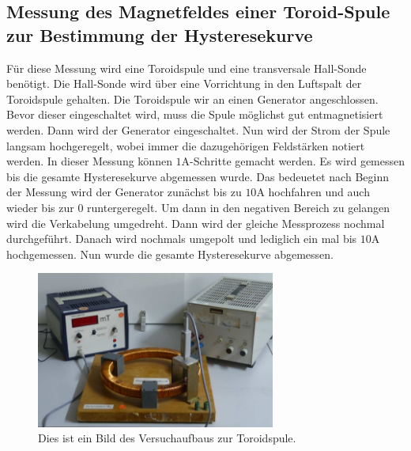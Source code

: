 \subsection{Messung des Magnetfeldes einer Toroid-Spule zur Bestimmung der Hysteresekurve}
\label{subsec:D_Hysterese}
Für diese Messung wird eine Toroidspule und eine transversale Hall-Sonde benötigt. Die Hall-Sonde wird über eine Vorrichtung in den Luftspalt der Toroidspule gehalten. Die Toroidspule
wir an einen Generator angeschlossen. Bevor dieser eingeschaltet wird, muss die Spule möglichst gut entmagnetisiert werden. Dann wird der Generator eingeschaltet. Nun wird der Strom
der Spule langsam hochgeregelt, wobei immer die dazugehörigen Feldstärken notiert werden. In dieser Messung können $1\unit{\ampere}$-Schritte gemacht werden. Es wird gemessen bis die 
gesamte Hysteresekurve abgemessen wurde. Das bedeuetet nach Beginn der Messung wird der Generator zunächst bis zu $10\unit{\ampere}$ hochfahren und auch wieder bis zur $0$ runtergeregelt.
Um dann in den negativen Bereich zu gelangen wird die Verkabelung umgedreht. Dann wird der gleiche Messprozess nochmal durchgeführt. Danach wird nochmals umgepolt und lediglich ein mal 
bis $10\unit{\ampere}$ hochgemessen. Nun wurde die gesamte Hysteresekurve abgemessen.
\begin{figure}
    \centering
    \caption{Dies ist ein Bild des Versuchaufbaus zur Toroidspule.\cite{v308}}
    \label{fig:Aufbau_Toroid}
    \includegraphics[width=0.7\textwidth]{content/RingSpuleAufbau.PNG}
\end{figure}